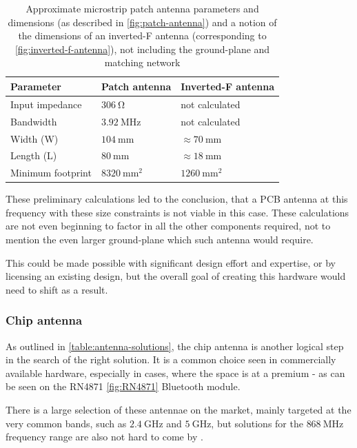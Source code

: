 \begin{table}[H]
\begin{center}
\caption{\label{table:antenna-pcb-calculations}Approximate microstrip patch antenna parameters and dimensions (as described in \ref{fig:patch-antenna}) and a notion of the dimensions of an inverted-F antenna (corresponding to \ref{fig:inverted-f-antenna}), not including the ground-plane and matching network}
    \begin{tabular}{|l|l|l|} \hline
    \textbf{Parameter}  & \textbf{Patch antenna}    & \textbf{Inverted-F antenna} \\ \hline
    Input impedance     & $306~\mathrm{\Omega}$     & not calculated \\ \hline
    Bandwidth           & $3.92~\mathrm{MHz}$       & not calculated \\ \hline
    Width (W)           & $104~\mathrm{mm}$         & $\approx 70~\mathrm{mm}$ \\ \hline
    Length (L)          & $80~\mathrm{mm}$          & $\approx 18~\mathrm{mm}$ \\ \hline
    Minimum footprint   & $8320~\mathrm{mm^2}$      & $1260~\mathrm{mm^2}$ \\ \hline
    \end{tabular}
\end{center}
\end{table}

These preliminary calculations led to the conclusion, that a PCB antenna at this frequency with these size constraints is not viable in this case. These calculations are not even beginning to factor in all the other components required, not to mention the even larger ground-plane which such antenna would require. 

This could be made possible with significant design effort and expertise, or by licensing an existing design, but the overall goal of creating this hardware would need to shift as a result.

\subsubsection{Chip antenna}
As outlined in \ref{table:antenna-solutions}, the chip antenna is another logical step in the search of the right solution. It is a common choice seen in commercially available hardware, especially in cases, where the space is at a premium - as can be seen on the RN4871 \ref{fig:RN4871} Bluetooth module.

There is a large selection of these antennae on the market, mainly targeted at the very common bands, such as $2.4~\mathrm{GHz}$ and $5~\mathrm{GHz}$, but solutions for the $868~\mathrm{MHz}$ frequency range are also not hard to come by \cite{digikey_rf_2024,mouser_europe_868_2024}.


